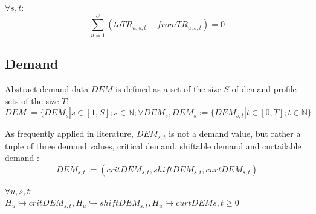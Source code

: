 \documentclass[
	11pt,								%
	DIV10,								%
	a4paper,         					%
	oneside,							%
	headheight=20pt,					%
	footheight=20pt,					%
    parskip=full,						%
    listof=totoc,						%
	bibliography=totoc,					%
	index=totoc,						%
]{scrartcl}
\begin{document}
$\forall s,t$:
\begin{equation}
	\sum_{u = 1}^{U}(toTR_{u,s,t}-fromTR_{u,s,t}) = 0
\end{equation}





\subsection{Demand}
Abstract demand data $DEM$ is defined as a set of the size $S$ of demand profile sets of the size $T$:
\begin{equation}
 DEM:= \{DEM_s | s \in [1,S]; s\in \mathbb{N}; \forall DEM_s, DEM_s := \{DEM_{s,t} | t\in [0,T]; t \in \mathbb{N}\}
\end{equation}

As frequently applied in literature, $DEM_{s,t}$ is not a demand value, but rather a tuple of three demand values, critical demand, shiftable demand and curtailable demand \cite{silvente2015rolling}\cite{zhang2015optimal}\cite{8216436}\cite{7972908} : \\
\begin{equation}
 DEM_{s,t}:= (critDEM_{s,t}, shiftDEM_{s,t}, curtDEM_{s,t}) 
\end{equation}

$\forall u,s,t$:\\
$H_u \hookrightarrow critDEM_{s,t}, H_u \hookrightarrow shiftDEM_{s,t}, H_u \hookrightarrow curtDEM{s,t} \geq 0$
\end{document}
